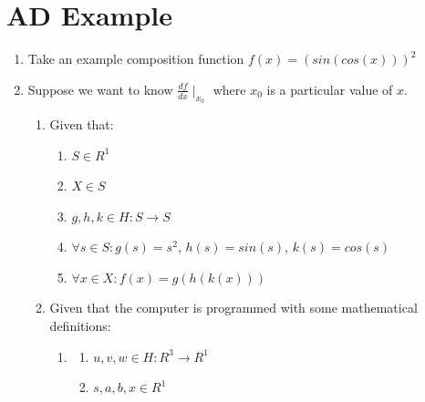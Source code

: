 \documentclass[preprint,12pt]{elsarticle}
\begin{document}
\section{AD Example}
\label{sec:appendixB}

\begin{enumerate}
\item Take an example composition function $f(x) = (sin(cos(x)))^2$\\

\item Suppose we want to know $\frac{df}{dx} \mid_{x_0}$ where $x_0$ is a particular value of $x$. \\

\begin{enumerate}
\item Given that: \\
\label{given}
\begin{enumerate}
\item $S \in R^1$ 
\item $X \in S$ 
\item $g, h, k \in H: S \rightarrow S$ 
\item $\forall s \in S : g(s) = {s}^2$, $h(s) = sin(s)$, $k(s) = cos(s)$ 
\item
\label{composition}
$\forall x \in X : f(x) = g(h(k(x)))$ \\
\end{enumerate}

\item Given that the computer is programmed with some mathematical definitions:\\
\begin{enumerate}
\item
\begin{enumerate}
\item
$u, v, w \in H: R^3 \rightarrow R^1$ \\
\item
$s,a,b,x \in R^1$\\
\end{enumerate}


\end{enumerate}
\end{enumerate}
\end{enumerate}
\end{document}
